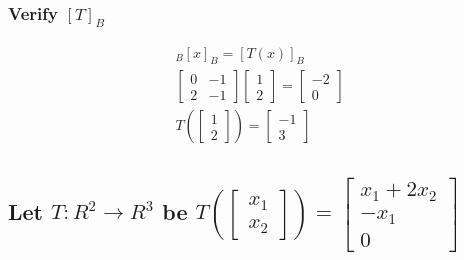 \documentclass[12pt, a4paper]{article}
\begin{document}
			\subsubsection{Verify $[T]_B$}
				\begin{align*}
					[T]_B[x]_B=[T(x)]_B\\
					\begin{bmatrix}0&-1\\2&-1\end{bmatrix}\begin{bmatrix}1\\2\end{bmatrix}=\begin{bmatrix}-2\\0\end{bmatrix}\\
					T(\begin{bmatrix}1\\2\end{bmatrix})=\begin{bmatrix}-1\\3\end{bmatrix}
				\end{align*}
		\subsection{Let $T:R^2\rightarrow R^3$ be $T(\begin{bmatrix}x_1\\x_2\end{bmatrix})=\begin{bmatrix}x_1+2x_2\\-x_1\\0\end{bmatrix}$}
\end{document}
